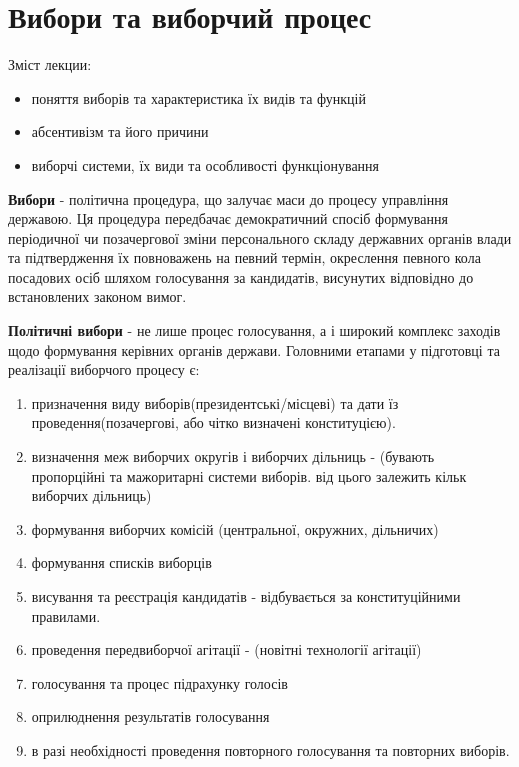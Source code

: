 \section{Вибори та виборчий процес}
Зміст лекции:
\begin{itemize}
	\item поняття виборів та характеристика їх видів та функцій
	\item абсентивізм та його причини
	\item виборчі системи, їх види та особливості функціонування
\end{itemize}

\textbf{Вибори} - політична процедура, що залучає маси до процесу управління державою. Ця процедура передбачає демократичний спосіб формування періодичної чи позачергової зміни персонального складу державних органів влади та підтвердження їх повноважень на певний термін, окреслення певного кола посадових осіб шляхом голосування за кандидатів, висунутих відповідно до встановлених законом вимог.

\textbf{Політичні вибори} - не лише процес голосування, а і широкий комплекс заходів щодо формування керівних органів держави. Головними етапами у підготовці та реалізації виборчого процесу є:
\begin{enumerate}
	\item призначення виду виборів(президентські/місцеві) та дати їз проведення(позачергові, або чітко визначені конституцією).
	\item визначення меж виборчих округів і виборчих дільниць - (бувають пропорційні та мажоритарні системи виборів. від цього залежить кільк виборчих дільниць)
	\item формування виборчих комісій (центральної, окружних, дільничих)  
	\item формування списків виборців
	\item висування та реєстрація кандидатів - відбувається за конституційними правилами.
	\item проведення передвиборчої агітації -  (новітні технології агітації)
	\item голосування та процес підрахунку голосів
	\item оприлюднення результатів голосування
	\item в разі необхідності проведення повторного голосування та повторних виборів.
\end{enumerate}

